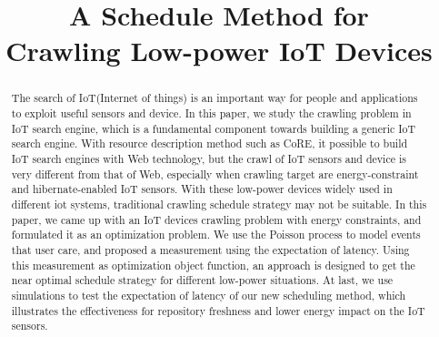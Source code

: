 \documentclass[conference]{IEEEtran}
\begin{document}
%
\title{A Schedule Method for\\Crawling Low-power IoT Devices}

\author{
}

\maketitle


\begin{abstract}
The search of IoT(Internet of things) is an important way for people and applications to exploit useful sensors and device. In this paper, we study the crawling problem in IoT search engine, which is a fundamental component towards building a generic IoT search engine.
With resource description method such as CoRE, it possible to build IoT search engines with Web technology, but the crawl of IoT sensors and device is very different from that of Web, especially when crawling target are energy-constraint and hibernate-enabled IoT sensors. With these low-power devices widely used in different iot systems, traditional crawling schedule strategy may not be suitable.
In this paper, we came up with an IoT devices crawling problem with energy constraints, and formulated it as an optimization problem. 
We use the Poisson process to model events that user care, and proposed a measurement using the expectation of latency. 
Using this measurement as optimization object function, an approach is designed to get the near optimal schedule strategy for different low-power situations.
At last, we use simulations to test the expectation of latency of our new scheduling method, which illustrates the effectiveness for repository freshness and lower energy impact on the IoT sensors.
\end{abstract}
\end{document}
